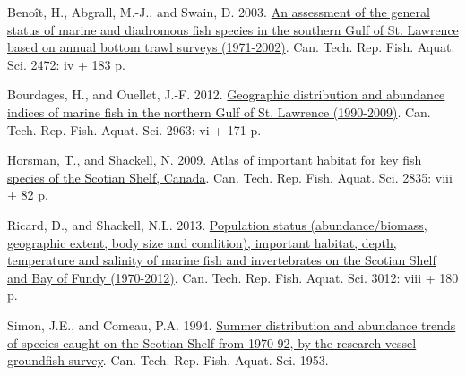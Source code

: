 \documentclass[12pt]{article}\usepackage[]{graphicx}\usepackage[]{color}
\begin{document}
\hypertarget{refs}{}
\hypertarget{ref-Benoit:etal:2003:techreport}{}
Benoît, H., Abgrall, M.-J., and Swain, D. 2003. \href{http://publications.gc.ca/site/eng/428386/publication.html}{An assessment of the general status of marine and diadromous fish species in the southern Gulf of St. Lawrence based on annual bottom trawl surveys (1971-2002)}. Can. Tech. Rep. Fish. Aquat. Sci. 2472: iv + 183 p.

\hypertarget{ref-Bourdages:NGatlas:2012}{}
Bourdages, H., and Ouellet, J.-F. 2012. \href{http://publications.gc.ca/site/eng/425663/publication.html}{Geographic distribution and abundance indices of marine fish in the northern Gulf of St. Lawrence (1990-2009)}. Can. Tech. Rep. Fish. Aquat. Sci. 2963: vi + 171 p.

\hypertarget{ref-Horsman:atlas:2009}{}
Horsman, T., and Shackell, N. 2009. \href{http://publications.gc.ca/site/eng/353896/publication.html}{Atlas of important habitat for key fish species of the Scotian Shelf, Canada}. Can. Tech. Rep. Fish. Aquat. Sci. 2835: viii + 82 p.

\hypertarget{ref-Ricard:MARatlas:2013}{}
Ricard, D., and Shackell, N.L. 2013. \href{http://publications.gc.ca/site/eng/9.589947/publication.html}{Population status (abundance/biomass, geographic extent, body size and condition), important habitat, depth, temperature and salinity of marine fish and invertebrates on the Scotian Shelf and Bay of Fundy (1970-2012)}. Can. Tech. Rep. Fish. Aquat. Sci. 3012: viii + 180 p.

\hypertarget{ref-Simon:Comeau:1994}{}
Simon, J.E., and Comeau, P.A. 1994. \href{http://publications.gc.ca/site/eng/46517/publication.html}{Summer distribution and abundance trends of species caught on the Scotian Shelf from 1970-92, by the research vessel groundfish survey}. Can. Tech. Rep. Fish. Aquat. Sci. 1953.
\end{document}
